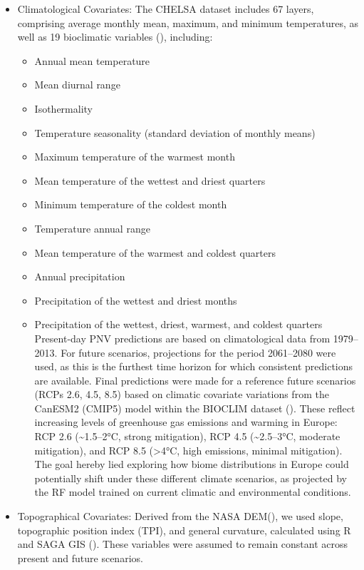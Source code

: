 \documentclass[
]{krantz}
\providecommand{\tightlist}{%
  \setlength{\itemsep}{0pt}\setlength{\parskip}{0pt}}
\begin{document}
\begin{itemize}
\tightlist
\item
  Climatological Covariates: The CHELSA dataset includes 67 layers, comprising average monthly mean, maximum, and minimum temperatures, as well as 19 bioclimatic variables (\citet{karger2017}), including:

  \begin{itemize}
  \tightlist
  \item
    Annual mean temperature
  \item
    Mean diurnal range
  \item
    Isothermality
  \item
    Temperature seasonality (standard deviation of monthly means)
  \item
    Maximum temperature of the warmest month
  \item
    Mean temperature of the wettest and driest quarters
  \item
    Minimum temperature of the coldest month\\
  \item
    Temperature annual range
  \item
    Mean temperature of the warmest and coldest quarters
  \item
    Annual precipitation
  \item
    Precipitation of the wettest and driest months
  \item
    Precipitation of the wettest, driest, warmest, and coldest quarters\\
    Present-day PNV predictions are based on climatological data from 1979--2013. For future scenarios, projections for the period 2061--2080 were used, as this is the furthest time horizon for which consistent predictions are available. Final predictions were made for a reference future scenarios (RCPs 2.6, 4.5, 8.5) based on climatic covariate variations from the CanESM2 (CMIP5) model within the BIOCLIM dataset (\citet{karger2017}). These reflect increasing levels of greenhouse gas emissions and warming in Europe: RCP 2.6 (\textasciitilde1.5--2°C, strong mitigation), RCP 4.5 (\textasciitilde2.5--3°C, moderate mitigation), and RCP 8.5 (\textgreater4°C, high emissions, minimal mitigation). The goal hereby lied exploring how biome distributions in Europe could potentially shift under these different climate scenarios, as projected by the RF model trained on current climatic and environmental conditions.
  \end{itemize}
\item
  Topographical Covariates:
  Derived from the NASA DEM(\citet{nasa2019}), we used slope, topographic position index (TPI), and general curvature, calculated using R and SAGA GIS (\citet{conrad2015}). These variables were assumed to remain constant across present and future scenarios.
\end{itemize}
\end{document}
